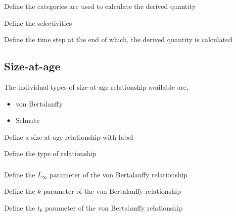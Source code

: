 \subsubsection[Biomass]{}

 {Define the categories are used to calculate the derived quantity}

 {Define the selectivities}

 {Define the time step at the end of which, the derived quantity is calculated}

\subsection{Size-at-age}

The individual types of size-at-age relationship available are, 

\begin{itemize}
	\item von Bertalanffy
	\item Schnute
\end{itemize}

 {Define a size-at-age relationship with label}

 {Define the type of relationship}

\subsubsection[von Bertalanffy]{}

 {Define the $L_\infty$ parameter of the von Bertalanffy relationship}

 {Define the $k$ parameter of the von Bertalanffy relationship}

 {Define the $t_0$ parameter of the von Bertalanffy relationship}

